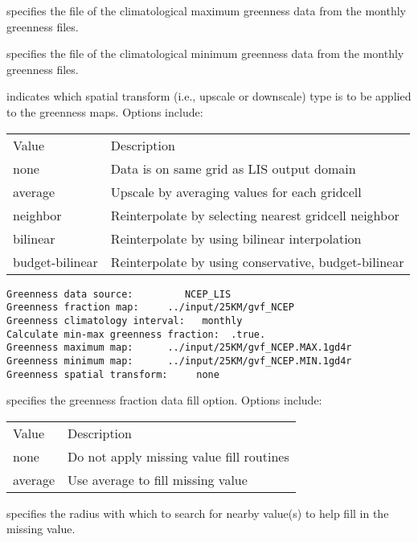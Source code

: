   specifies the file of the
 climatological maximum greenness data from the monthly
 greenness files.

  specifies the file of the
 climatological minimum greenness data from the monthly
 greenness files.

  indicates which spatial transform
 (i.e., upscale or downscale) type is to be applied to the greenness
 maps.  Options include:

 \begin{tabular}{ll}
 Value     & Description                                           \\
 none       & Data is on same grid as LIS output domain            \\
 average    & Upscale by averaging values for each gridcell        \\
 neighbor   & Reinterpolate by selecting nearest gridcell neighbor \\
 bilinear   & Reinterpolate by using bilinear interpolation        \\
 budget-bilinear & Reinterpolate by using conservative, budget-bilinear \\
 \end{tabular}
 

 \begin{Verbatim}[frame=single]
Greenness data source:         NCEP_LIS
Greenness fraction map:     ../input/25KM/gvf_NCEP
Greenness climatology interval:   monthly
Calculate min-max greenness fraction:  .true.
Greenness maximum map:      ../input/25KM/gvf_NCEP.MAX.1gd4r
Greenness minimum map:      ../input/25KM/gvf_NCEP.MIN.1gd4r
Greenness spatial transform:     none
 \end{Verbatim}

 
  specifies the greenness fraction
 data fill option.  Options include:

 \begin{tabular}{ll}
 Value    & Description                               \\
 none     &  Do not apply missing value fill routines \\
 average  &  Use average to fill missing value        \\
 \end{tabular}

  specifies the radius with which
 to search for nearby value(s) to help fill in the missing value.

